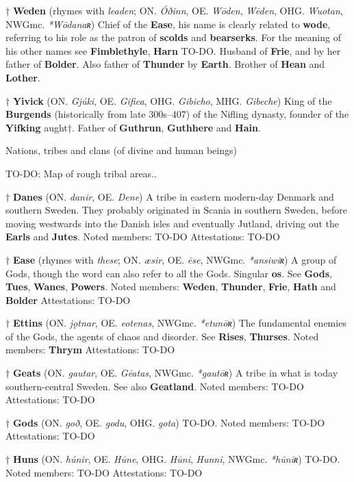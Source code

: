 † \textbf{Weden} (rhymes with \emph{leaden}; ON. \emph{Óðinn}, OE. \emph{Wōden}, \emph{Wēden}, OHG. \emph{Wuotan}, NWGmc. \emph{*Wōdanaʀ})
 Chief of the \textbf{Ease}, his name is clearly related to \textbf{wode}, referring to his role as the patron of \textbf{scolds} and \textbf{bearserks}. For the meaning of his other names see \textbf{Fimblethyle}, \textbf{Harn} TO-DO. Husband of \textbf{Frie}, and by her father of \textbf{Bolder}. Also father of \textbf{Thunder} by \textbf{Earth}. Brother of \textbf{Hean} and \textbf{Lother}.

† \textbf{Yivick} (ON. \emph{Gjúki}, OE. \emph{Gifica}, OHG. \emph{Gibicho}, MHG. \emph{Gibeche})
 King of the \textbf{Burgends} (historically from late 300s–407) of the Nifling dynasty, founder of the \textbf{Yifking} aught†. Father of \textbf{Guthrun}, \textbf{Guthhere} and \textbf{Hain}.



Nations, tribes and clans (of divine and human beings)

TO-DO: Map of rough tribal areas..

† \textbf{Danes} (ON. \emph{danir}, OE. \emph{Dene})
 A tribe in eastern modern-day Denmark and southern Sweden. They probably originated in Scania in southern Sweden, before moving westwards into the Danish isles and eventually Jutland, driving out the \textbf{Earls} and \textbf{Jutes}.
 Noted members: TO-DO
 Attestations: TO-DO

† \textbf{Ease} (rhymes with \emph{these}; ON. \emph{æsir}, OE. \emph{ēse}, NWGmc. \emph{*ansiwiʀ})
 A group of Gods, though the word can also refer to all the Gods. Singular \textbf{os}. See \textbf{Gods}, \textbf{Tues}, \textbf{Wanes}, \textbf{Powers}.
 Noted members: \textbf{Weden}, \textbf{Thunder}, \textbf{Frie}, \textbf{Hath} and \textbf{Bolder}
 Attestations: TO-DO

† \textbf{Ettins} (ON. \emph{jǫtnar}, OE. \emph{eotenas}, NWGmc. \emph{*etunōʀ})
 The fundamental enemies of the Gods, the agents of chaos and disorder. See \textbf{Rises}, \textbf{Thurses}.
 Noted members: \textbf{Thrym}
 Attestations: TO-DO

† \textbf{Geats} (ON. \emph{gautar}, OE. \emph{Gēatas}, NWGmc. \emph{*gautōʀ})
 A tribe in what is today southern-central Sweden. See also \textbf{Geatland}.
 Noted members: TO-DO
 Attestations: TO-DO

† \textbf{Gods} (ON. \emph{goð}, OE. \emph{godu}, OHG. \emph{gota})
 TO-DO.
 Noted members: TO-DO
 Attestations: TO-DO

† \textbf{Huns} (ON. \emph{húnir}, OE. \emph{Hūne}, OHG. \emph{Hūni}, \emph{Hunni}, NWGmc. \emph{*hūnīʀ})
 TO-DO.
 Noted members: TO-DO
 Attestations: TO-DO

